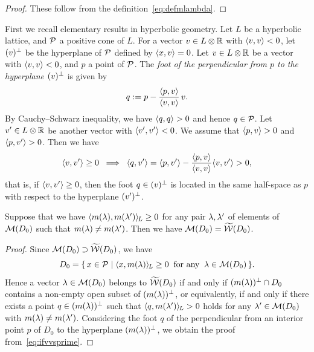\documentclass{amsart} %
\begin{document}
%
\begin{proof}
These follow from the definition~\eqref{eq:defmlambda}.
\end{proof}
%
%
First we recall elementary results in hyperbolic geometry.
Let $L$ be a hyperbolic lattice, and $\mathord{\mathcal{P}}$ a positive cone of $L$.
For a vector $v\in L\otimes\mathord{\mathbb{R}}$ with $\langle v, v \rangle<0$,
let $(v)^{\perp}$ be the hyperplane of $\mathord{\mathcal{P}}$ defined by $\langle x, v \rangle=0$.
Let $v\in L\otimes\mathord{\mathbb{R}}$ be a vector with $\langle v, v \rangle<0$, and 
$p$ a point of $\mathord{\mathcal{P}}$.
The \emph{foot of the perpendicular from $p$ to the hyperplane $(v)^{\perp}$ }
is given by
\[
q:=p-\frac{\langle p, v \rangle}{\langle v,v \rangle}\, v.
\]
By Cauchy--Schwarz inequality,
we have $\langle q, q \rangle>0$
and hence 
$q\in \mathord{\mathcal{P}}$.
Let $v^{\prime}\in L\otimes\mathord{\mathbb{R}}$ be another vector with $\langle v^{\prime}, v^{\prime} \rangle<0$.
We assume that $\langle p, v \rangle>0$ and $\langle p, v^{\prime} \rangle>0$.
Then we have
%
\begin{equation}\label{eq:ifvvsprime}
\langle v, v^{\prime} \rangle\ge 0 \;\;\Longrightarrow \;\; \langle q, v^{\prime} \rangle=
\langle p, v^{\prime} \rangle-\dfrac{\langle p, v \rangle}{\langle v,v \rangle} \langle v, v^{\prime} \rangle>0,
\end{equation}
%
that is, if $\langle v, v^{\prime} \rangle\ge 0$, 
then the foot $q\in (v)^{\perp}$ is located in the same half-space as $p$ with respect to the hyperplane 
$(v^{\prime})^{\perp}$.
%
%
\begin{lemma}\label{lem:pairsofMMM}
Suppose that we have
$\langle m(\lambda), m(\lambda^{\prime}) \rangle_{\hskip -1pt L}\ge 0$
for any pair $\lambda, \lambda^{\prime}$ of elements of $ \mathord{\mathcal{M}}(D_0)$
such that $m(\lambda)\ne m(\lambda^{\prime})$.
Then we have 
$\mathord{\mathcal{M}}(D_0)=\widetilde{\mathord{\mathcal{W}}} (D_0)$.
\end{lemma}
%
\begin{proof}
Since $\mathord{\mathcal{M}}(D_0)\supset \widetilde{\mathord{\mathcal{W}}} (D_0)$,
 we have 
 \[
 D_0=\{\,{x\in \mathord{\mathcal{P}}}\mid {\langle x, m(\lambda) \rangle_{\hskip -1pt L}\ge 0\;\; \textrm{for any} \;\; \lambda\in \mathord{\mathcal{M}}(D_0)} \,\}.
\]
Hence a vector $\lambda\in \mathord{\mathcal{M}}(D_0)$ belongs to $\widetilde{\mathord{\mathcal{W}}} (D_0)$
if and only if 
$(m(\lambda))^{\perp} \cap D_0$ contains a non-empty open subset of $(m(\lambda))^{\perp} $,
or equivalently,
if and only if 
there exists a point $q\in (m(\lambda))^{\perp}$
such that $\langle q, m(\lambda^{\prime}) \rangle_{\hskip -1pt L}> 0$ holds for any $\lambda^{\prime}\in \mathord{\mathcal{M}}(D_0)$
with $m(\lambda)\ne m(\lambda^{\prime})$.
Considering the foot $q$ of 
the perpendicular from an interior point $p$ of $D_0$
to the hyperplane $(m(\lambda))^{\perp}$,
we obtain the proof from~\eqref{eq:ifvvsprime}.
\end{proof}
\end{document}
